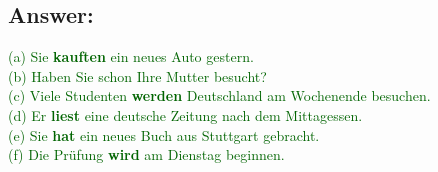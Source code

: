 \documentclass[a4paper,12pt]{article}
\begin{document}
\subsection*{Answer:}
\textcolor{darkgreen}{(a) Sie \textbf{kauften} ein neues Auto gestern.\\} \textcolor{darkgreen}{(b) Haben Sie schon Ihre Mutter besucht?\\}
\textcolor{darkgreen}{(c) Viele Studenten \textbf{werden} Deutschland am Wochenende besuchen.\\}
\textcolor{darkgreen}{(d) Er \textbf{liest} eine deutsche Zeitung nach dem Mittagessen.\\}
\textcolor{darkgreen}{(e) Sie \textbf{hat} ein neues Buch aus Stuttgart gebracht.\\}
\textcolor{darkgreen}{(f) Die Prüfung \textbf{wird} am Dienstag beginnen.\\}
\end{document}
